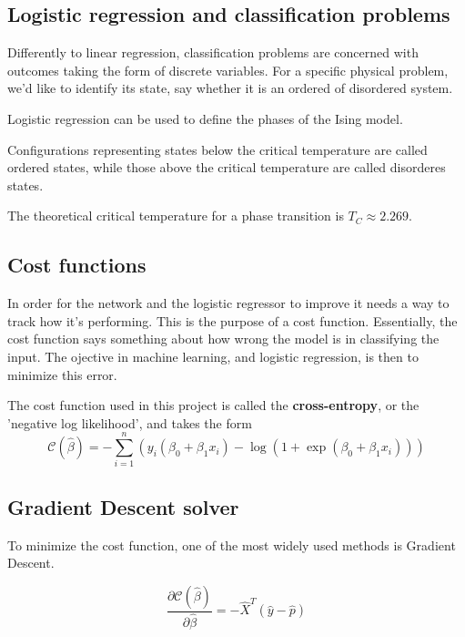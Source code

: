 \subsection{Logistic regression and classification problems}
Differently to linear regression, classification problems 
are concerned with outcomes taking the form of discrete variables. 
For a specific physical problem, we'd like to identify its state, say whether
it is an ordered of disordered system. ~\cite{LectureNotes-FysStk}

Logistic regression can be used to define the phases of the Ising
model.~\cite{LectureNotes} 

Configurations representing states below the critical temperature are called
ordered states, while those above the critical temperature are called 
disorderes states. ~\cite{Project2} 

The theoretical critical temperature for a phase transition is 
\(T_C \approx 2.269\). 

\subsection{Cost functions} 
In order for the network and the logistic regressor to improve it needs a way to 
track how it's performing. This is the purpose of a cost function. Essentially,
the cost function says something about how wrong the model is in classifying the
input. The ojective in machine learning, and logistic regression, is then to minimize
this error.

The cost function used in this project is called the \textbf{cross-entropy}, or the
'negative log likelihood', and takes the form
\begin{equation}\label{eq:cross-entropy}
	\mathcal{C}(\hat{\beta})=-\sum_{i=1}^n  \left(y_i(\beta_0+\beta_1x_i) -\log{(1+\exp{(\beta_0+\beta_1x_i)})}\right)
\end{equation}

\subsection{Gradient Descent solver}
To minimize the cost function, one of the most widely used methods is Gradient Descent.


\begin{equation}\label{eq:delta-c}
	\frac{\partial \mathcal{C}(\hat{\beta})}{\partial \hat{\beta}} = -\hat{X}^T\left(\hat{y}-\hat{p}\right)
\end{equation}

